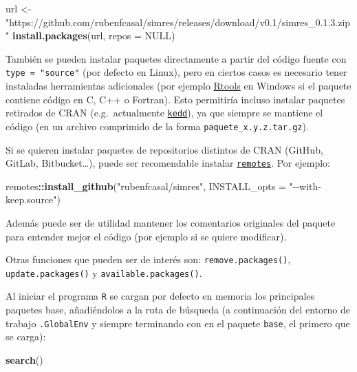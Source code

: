 \documentclass[
]{book}
\newenvironment{Shaded}{\begin{snugshade}}{\end{snugshade}}
\newcommand{\AttributeTok}[1]{\textcolor[rgb]{0.13,0.29,0.53}{#1}}
\newcommand{\ConstantTok}[1]{\textcolor[rgb]{0.56,0.35,0.01}{#1}}
\newcommand{\FunctionTok}[1]{\textcolor[rgb]{0.13,0.29,0.53}{\textbf{#1}}}
\newcommand{\NormalTok}[1]{#1}
\newcommand{\OtherTok}[1]{\textcolor[rgb]{0.56,0.35,0.01}{#1}}
\newcommand{\SpecialCharTok}[1]{\textcolor[rgb]{0.81,0.36,0.00}{\textbf{#1}}}
\newcommand{\StringTok}[1]{\textcolor[rgb]{0.31,0.60,0.02}{#1}}
\theoremstyle{break}
\theoremstyle{nonumberplain}
\begin{document}
\begin{Shaded}
\begin{Highlighting}[]
\NormalTok{url }\OtherTok{\textless{}{-}} \StringTok{"https://github.com/rubenfcasal/simres/releases/download/v0.1/simres\_0.1.3.zip"}
\FunctionTok{install.packages}\NormalTok{(url, }\AttributeTok{repos =} \ConstantTok{NULL}\NormalTok{)}
\end{Highlighting}
\end{Shaded}

También se pueden instalar paquetes directamente a partir del código fuente con \texttt{type\ =\ "source"} (por defecto en Linux), pero en ciertos casos es necesario tener instaladas herramientas adicionales (por ejemplo \href{https://cran.r-project.org/bin/windows/Rtools}{Rtools} en Windows si el paquete contiene código en C, C++ o Fortran).
Esto permitiría incluso instalar paquetes retirados de CRAN (e.g.~actualmente \href{https://CRAN.R-project.org/package=kedd}{\texttt{kedd}}), ya que siempre se mantiene el código (en un archivo comprimido de la forma \texttt{paquete\_x.y.z.tar.gz}).

Si se quieren instalar paquetes de repositorios distintos de CRAN (GitHub, GitLab, Bitbucket\ldots), puede ser recomendable instalar \href{https://remotes.r-lib.org/}{\texttt{remotes}}.
Por ejemplo:

\begin{Shaded}
\begin{Highlighting}[]
\NormalTok{remotes}\SpecialCharTok{::}\FunctionTok{install\_github}\NormalTok{(}\StringTok{"rubenfcasal/simres"}\NormalTok{, }\AttributeTok{INSTALL\_opts =} \StringTok{"{-}{-}with{-}keep.source"}\NormalTok{)}
\end{Highlighting}
\end{Shaded}

Además puede ser de utilidad mantener los comentarios originales del paquete para entender mejor el código (por ejemplo si se quiere modificar).

Otras funciones que pueden ser de interés son: \texttt{remove.packages()}, \texttt{update.packages()} y \texttt{available.packages()}.

Al iniciar el programa \texttt{R} se cargan por defecto en memoria los principales paquetes base, añadiéndolos a la ruta de búsqueda (a continuación del entorno de trabajo \texttt{.GlobalEnv} y siempre terminando con en el paquete \texttt{base}, el primero que se carga):

\begin{Shaded}
\begin{Highlighting}[]
\FunctionTok{search}\NormalTok{()}
\end{Highlighting}
\end{Shaded}
\end{document}

